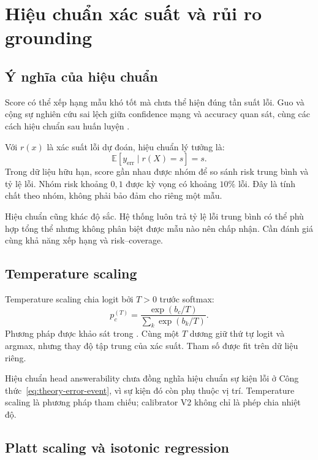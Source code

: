 \section{Hiệu chuẩn xác suất và rủi ro grounding}
\label{sec:theory-calibration}

\subsection{Ý nghĩa của hiệu chuẩn}

Score có thể xếp hạng mẫu khó tốt mà chưa thể hiện đúng tần suất lỗi. Guo và cộng sự nghiên cứu sai lệch giữa confidence mạng và accuracy quan sát, cùng các cách hiệu chuẩn sau huấn luyện \cite{guo2017calibration}.

Với $r(x)$ là xác suất lỗi dự đoán, hiệu chuẩn lý tưởng là:
\begin{equation}
    \mathbb{E}[y_{\mathrm{err}}\mid r(X)=s]=s.
    \label{eq:theory-risk-calibration}
\end{equation}
Trong dữ liệu hữu hạn, score gần nhau được nhóm để so sánh risk trung bình và tỷ lệ lỗi. Nhóm risk khoảng $0{,}1$ được kỳ vọng có khoảng $10\%$ lỗi. Đây là tính chất theo nhóm, không phải bảo đảm cho riêng một mẫu.

Hiệu chuẩn cũng khác độ sắc. Hệ thống luôn trả tỷ lệ lỗi trung bình có thể phù hợp tổng thể nhưng không phân biệt được mẫu nào nên chấp nhận. Cần đánh giá cùng khả năng xếp hạng và risk--coverage.

\subsection{Temperature scaling}

Temperature scaling chia logit bởi $T>0$ trước softmax:
\begin{equation}
    p_c^{(T)}=\frac{\exp(b_c/T)}{\sum_k\exp(b_k/T)}.
    \label{eq:theory-temperature}
\end{equation}
Phương pháp được khảo sát trong \cite{guo2017calibration}. Cùng một $T$ dương giữ thứ tự logit và argmax, nhưng thay độ tập trung của xác suất. Tham số được fit trên dữ liệu riêng.

Hiệu chuẩn head answerability chưa đồng nghĩa hiệu chuẩn sự kiện lỗi ở Công thức~\eqref{eq:theory-error-event}, vì sự kiện đó còn phụ thuộc vị trí. Temperature scaling là phương pháp tham chiếu; calibrator V2 không chỉ là phép chia nhiệt độ.

\subsection{Platt scaling và isotonic regression}

